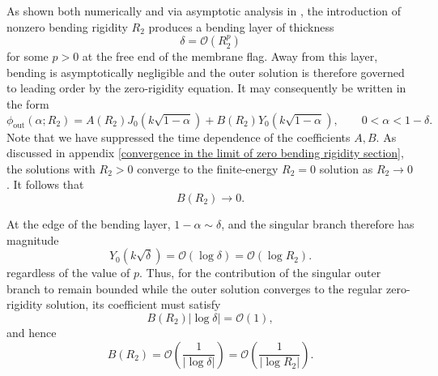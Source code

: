 \documentclass{article}[12pt]
\theoremstyle{Theorem}
\begin{document}
As shown both numerically and via asymptotic analysis in \cite{manela2017hanging}, the introduction of nonzero bending rigidity $R_2$ produces a bending layer of thickness
\begin{equation}
    \delta = \mathcal{O}(R_2^p)
\end{equation}
for some $p>0$ at the free end of the membrane flag. Away from this layer, bending is asymptotically negligible and the outer solution is therefore governed to leading order by the zero-rigidity equation. It may consequently be written in the form
\begin{equation}
    \phi_{\mathrm{out}}(\alpha;R_2)
    =
    A(R_2)J_0(k\sqrt{1-\alpha})
    +
    B(R_2)Y_0(k\sqrt{1-\alpha}),
    \qquad
    0<\alpha<1-\delta .
\end{equation}
Note that we have suppressed the time dependence of the coefficients $A,B$. As discussed in appendix \ref{convergence in the limit of zero bending rigidity section}, the solutions with $R_2>0$ converge to the finite-energy $R_2=0$ solution as $R_2\rightarrow0$. It follows that
\begin{equation}
    B(R_2)\rightarrow0.
\end{equation}

At the edge of the bending layer, $1-\alpha\sim\delta$, and the singular branch therefore has magnitude
\begin{equation}
    Y_0(k\sqrt{\delta})
    =
    \mathcal{O}(\log\delta)
    =
    \mathcal{O}(\log R_2).
\end{equation}
regardless of the value of $p$. Thus, for the contribution of the singular outer branch to remain bounded while the outer solution converges to the regular zero-rigidity solution, its coefficient must satisfy
\begin{equation}
    B(R_2)|\log\delta|= \mathcal{O}(1),
\end{equation}
and hence
\begin{equation}
    B(R_2)
    =
    \mathcal{O}\left(\frac{1}{|\log\delta|}\right)
    =
    \mathcal{O}\left(\frac{1}{|\log R_2|}\right).
    \label{B inverse log scaling}
\end{equation}
\end{document}
